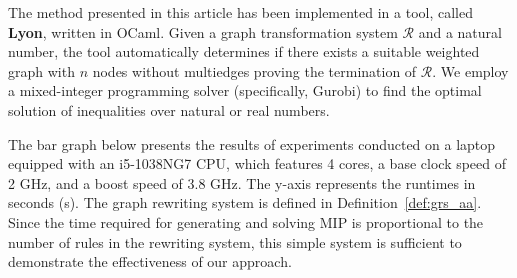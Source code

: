 The method presented in this article has been implemented in a tool, called \textbf{Lyon}, written in OCaml. Given a graph transformation system $\mathcal{R}$ and a natural number, the tool automatically determines if there exists a suitable weighted graph with $n$ nodes without multiedges proving the termination of $\mathcal{R}$. We employ a mixed-integer programming solver (specifically, Gurobi) to find the optimal solution of inequalities over natural or real numbers.

The bar graph below presents the results of experiments conducted on a laptop equipped with an i5-1038NG7 CPU, which features 4 cores, a base clock speed of 2 GHz, and a boost speed of 3.8 GHz. The y-axis represents the runtimes in seconds (s). The graph rewriting system is defined in Definition~\ref{def:grs_aa}. Since the time required for generating and solving MIP is proportional to the number of rules in the rewriting system, this simple system is sufficient to demonstrate the effectiveness of our approach.


